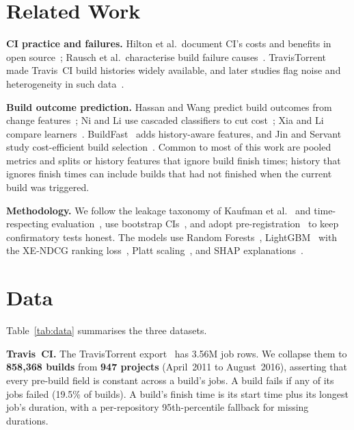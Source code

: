 \documentclass[conference]{IEEEtran}
\begin{document}
\section{Related Work}

\textbf{CI practice and failures.} Hilton et al.\ document CI's costs and benefits in open source~\cite{hilton2016usage}; Rausch et al.\ characterise build failure causes~\cite{rausch2017empirical}. TravisTorrent~\cite{beller2017travistorrent} made Travis~CI build histories widely available, and later studies flag noise and heterogeneity in such data~\cite{gallaba2018noise,durieux2019analysis}.

\textbf{Build outcome prediction.} Hassan and Wang predict build outcomes from change features~\cite{hassan2017change}; Ni and Li use cascaded classifiers to cut cost~\cite{ni2017cost}; Xia and Li compare learners~\cite{xia2017could}. BuildFast~\cite{chen2020buildfast} adds history-aware features, and Jin and Servant study cost-efficient build selection~\cite{jin2020cost}. Common to most of this work are pooled metrics and splits or history features that ignore build finish times; history that ignores finish times can include builds that had not finished when the current build was triggered.

\textbf{Methodology.} We follow the leakage taxonomy of Kaufman et al.~\cite{kaufman2012leakage} and time-respecting evaluation~\cite{bergmeir2012use}, use bootstrap CIs~\cite{efron1993introduction}, and adopt pre-registration~\cite{nosek2018preregistration} to keep confirmatory tests honest. The models use Random Forests~\cite{breiman2001random}, LightGBM~\cite{ke2017lightgbm} with the XE-NDCG ranking loss~\cite{bruch2021alternative}, Platt scaling~\cite{platt1999probabilistic}, and SHAP explanations~\cite{lundberg2017unified}.

\section{Data}

Table~\ref{tab:data} summarises the three datasets.

\textbf{Travis~CI.} The TravisTorrent export~\cite{beller2017travistorrent} has 3.56M job rows. We collapse them to \textbf{858{,}368 builds} from \textbf{947 projects} (April~2011 to August~2016), asserting that every pre-build field is constant across a build's jobs. A build fails if any of its jobs failed (19.5\% of builds). A build's finish time is its start time plus its longest job's duration, with a per-repository 95th-percentile fallback for missing durations.
\end{document}
